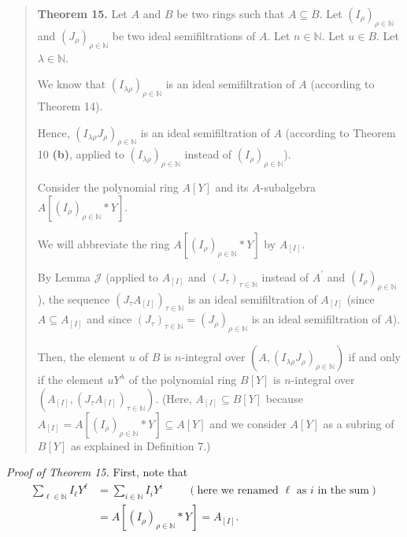 \documentclass[12pt,final,notitlepage,onecolumn]{article}%
\begin{document}
\begin{quote}
\textbf{Theorem 15.} Let $A$ and $B$ be two rings such that $A\subseteq B$.
Let $\left(  I_{\rho}\right)  _{\rho\in\mathbb{N}}$ and $\left(  J_{\rho
}\right)  _{\rho\in\mathbb{N}}$ be two ideal semifiltrations of $A$. Let
$n\in\mathbb{N}$. Let $u\in B$. Let $\lambda\in\mathbb{N}$.

We know that $\left(  I_{\lambda\rho}\right)  _{\rho\in\mathbb{N}}$ is an
ideal semifiltration of $A$ (according to Theorem 14).

Hence, $\left(  I_{\lambda\rho}J_{\rho}\right)  _{\rho\in\mathbb{N}}$ is an
ideal semifiltration of $A$ (according to Theorem 10 \textbf{(b)}, applied to
$\left(  I_{\lambda\rho}\right)  _{\rho\in\mathbb{N}}$ instead of $\left(
I_{\rho}\right)  _{\rho\in\mathbb{N}}$).

Consider the polynomial ring $A\left[  Y\right]  $ and its $A$-subalgebra
$A\left[  \left(  I_{\rho}\right)  _{\rho\in\mathbb{N}}\ast Y\right]  $.

We will abbreviate the ring $A\left[  \left(  I_{\rho}\right)  _{\rho
\in\mathbb{N}}\ast Y\right]  $ by $A_{\left[  I\right]  }$.

By Lemma $\mathcal{J}$ (applied to $A_{\left[  I\right]  }$ and $\left(
J_{\tau}\right)  _{\tau\in\mathbb{N}}$ instead of $A^{\prime}$ and $\left(
I_{\rho}\right)  _{\rho\in\mathbb{N}}$), the sequence $\left(  J_{\tau
}A_{\left[  I\right]  }\right)  _{\tau\in\mathbb{N}}$ is an ideal
semifiltration of $A_{\left[  I\right]  }$ (since $A\subseteq A_{\left[
I\right]  }$ and since $\left(  J_{\tau}\right)  _{\tau\in\mathbb{N}}=\left(
J_{\rho}\right)  _{\rho\in\mathbb{N}}$ is an ideal semifiltration of $A$).

Then, the element $u$ of $B$ is $n$-integral over $\left(  A,\left(
I_{\lambda\rho}J_{\rho}\right)  _{\rho\in\mathbb{N}}\right)  $ if and only if
the element $uY^{\lambda}$ of the polynomial ring $B\left[  Y\right]  $ is
$n$-integral over $\left(  A_{\left[  I\right]  },\left(  J_{\tau}A_{\left[
I\right]  }\right)  _{\tau\in\mathbb{N}}\right)  .$ (Here, $A_{\left[
I\right]  }\subseteq B\left[  Y\right]  $ because $A_{\left[  I\right]
}=A\left[  \left(  I_{\rho}\right)  _{\rho\in\mathbb{N}}\ast Y\right]
\subseteq A\left[  Y\right]  $ and we consider $A\left[  Y\right]  $ as a
subring of $B\left[  Y\right]  $ as explained in Definition 7.)
\end{quote}

\textit{Proof of Theorem 15.} First, note that%
\begin{align*}
\sum\limits_{\ell\in\mathbb{N}}I_{\ell}Y^{\ell}  &  =\sum\limits_{i\in
\mathbb{N}}I_{i}Y^{i}\ \ \ \ \ \ \ \ \ \ \left(  \text{here we renamed }%
\ell\text{ as }i\text{ in the sum}\right) \\
&  =A\left[  \left(  I_{\rho}\right)  _{\rho\in\mathbb{N}}\ast Y\right]
=A_{\left[  I\right]  }.
\end{align*}
\end{document}
